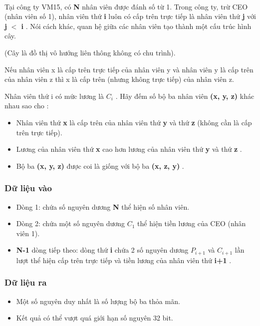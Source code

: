 

 

Tại công ty VM15, có \textbf{ N } nhân viên được đánh số từ 1. Trong công ty, trừ CEO (nhân viên số 1), nhân viên thứ \textbf{ i } luôn có cấp trên trực tiếp là nhân viên thứ \textbf{ j } với \textbf{ j }\textbf{ $<$ i } . Nói cách khác, quan hệ giữa các nhân viên tạo thành một cấu trúc hình cây.

(Cây là đồ thị vô hướng liên thông không có chu trình).

Nếu nhân viên x là cấp trên trực tiếp của nhân viên y và nhân viên y là cấp trên của nhân viên z thì x là cấp trên (nhưng không trực tiếp) của nhân viên z.

Nhân viên thứ i có mức lương là \textbf{ $C_{i}$} . Hãy đếm số bộ ba nhân viên \textbf{ (x, y, z) } khác nhau sao cho :
\begin{itemize}
	\item Nhân viên thứ \textbf{ x } là cấp trên của nhân viên thứ \textbf{ y } và thứ \textbf{ z } (không cần là cấp trên trực tiếp).
	\item Lương của nhân viên thứ \textbf{ x } cao hơn lương của nhân viên thứ \textbf{ y } và thứ \textbf{ z } .
	\item Bộ ba \textbf{ (x, y, z) } được coi là giống với bộ ba \textbf{ (x, z, y) } .
\end{itemize}

\subsubsection{Dữ liệu vào}
\begin{itemize}
	\item Dòng 1: chứa số nguyên dương \textbf{ N } thể hiện số nhân viên.
	\item Dòng 2: chứa một số nguyên dương \textbf{ $C_{1}$} thể hiện tiền lương của CEO (nhân viên 1).
	\item \textbf{N-1 } dòng tiếp theo: dòng thứ \textbf{ i } chứa 2 số nguyên dương \textbf{ $P_{i+1}$} và \textbf{ $C_{i+1}$} lần lượt thể hiện cấp trên trực tiếp và tiền lương của nhân viên thứ \textbf{ i+1 } .
\end{itemize}

\subsubsection{Dữ liệu ra}
\begin{itemize}
	\item Một số nguyên duy nhất là số lượng bộ ba thỏa mãn.
	\item Kết quả có thể vượt quá giới hạn số nguyên 32 bit.
\end{itemize}

